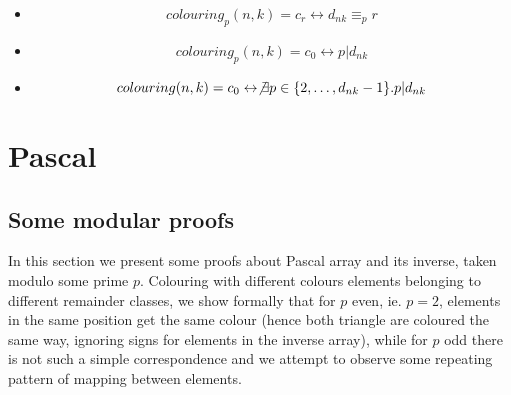 \documentclass[11pt,a4paper]{article} %
\begin{document}
    \begin{itemize}
        \item {}
            \begin{displaymath}
                colouring_{p}(n,k) = c_{r} \leftrightarrow d_{nk} \equiv_{p} r
            \end{displaymath}
        \item {}
            \begin{displaymath}
                colouring_{p}(n,k) = c_{0} \leftrightarrow p | d_{nk}
            \end{displaymath}
        \item {}
            \begin{displaymath}
                colouring(n,k) = c_{0} \leftrightarrow \not \exists p\in\lbrace 2,\ldots,d_{nk}-1\rbrace.p|d_{nk} 
            \end{displaymath}
    \end{itemize}

    \section{Pascal}

    \subsection{Some modular proofs}
    
    In this section we present some proofs about Pascal array and its
    inverse, taken modulo some prime $p$. Colouring with different
    colours elements belonging to different remainder classes, we show
    formally that for $p$ even, ie. $p=2$, elements in the same
    position get the same colour (hence both triangle are coloured the
    same way, ignoring signs for elements in the inverse array), while
    for $p$ odd there is not such a simple correspondence and we
    attempt to observe some repeating pattern of mapping between
    elements.
\end{document}
